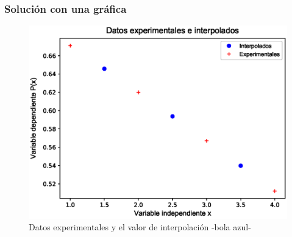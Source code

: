 \documentclass[12pt]{beamer}
\begin{document}
\begin{frame}
\frametitle{Solución con una gráfica}
\begin{figure}
	\centering
	\includegraphics[scale=0.5]{Imagenes/InterpLagrangen3_02.eps}
	\caption{Datos experimentales y el valor de interpolación -bola azul-}
\end{figure}
\end{frame}
\end{document}
